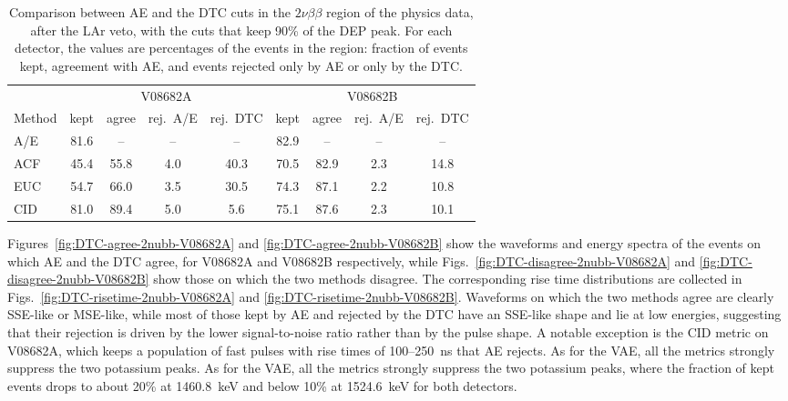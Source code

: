 \begin{table}[H]
    \centering
    \small
    \begin{tabular}{lcccccccc}
        \toprule
         & \multicolumn{4}{c}{V08682A} & \multicolumn{4}{c}{V08682B} \\
        \cmidrule(lr){2-5} \cmidrule(lr){6-9}
        Method & kept & agree & rej.\ A/E & rej.\ DTC & kept & agree & rej.\ A/E & rej.\ DTC \\
        \midrule
        A/E & 81.6 &  --  &  -- & --   & 82.9 &  --  &  -- & --   \\
        ACF & 45.4 & 55.8 & 4.0 & 40.3 & 70.5 & 82.9 & 2.3 & 14.8 \\
        EUC & 54.7 & 66.0 & 3.5 & 30.5 & 74.3 & 87.1 & 2.2 & 10.8 \\
        CID & 81.0 & 89.4 & 5.0 & 5.6  & 75.1 & 87.6 & 2.3 & 10.1 \\
        \bottomrule
    \end{tabular}
    \caption{Comparison between \ac{AE} and the \ac{DTC} cuts in the $2\nu\beta\beta$ region of the physics data, after the LAr veto, with the cuts that keep 90\% of the \ac{DEP} peak. For each detector, the values are percentages of the events in the region: fraction of events kept, agreement with \ac{AE}, and events rejected only by \ac{AE} or only by the \ac{DTC}.}
    \label{tab:DTC-cuts-2nubb}
\end{table}

Figures~\ref{fig:DTC-agree-2nubb-V08682A} and \ref{fig:DTC-agree-2nubb-V08682B} show the waveforms and energy spectra of the events on which \ac{AE} and the \ac{DTC} agree, for V08682A and V08682B respectively, while Figs.~\ref{fig:DTC-disagree-2nubb-V08682A} and \ref{fig:DTC-disagree-2nubb-V08682B} show those on which the two methods disagree. The corresponding rise time distributions are collected in Figs.~\ref{fig:DTC-risetime-2nubb-V08682A} and \ref{fig:DTC-risetime-2nubb-V08682B}. Waveforms on which the two methods agree are clearly \ac{SSE}-like or \ac{MSE}-like, while most of those kept by \ac{AE} and rejected by the \ac{DTC} have an \ac{SSE}-like shape and lie at low energies, suggesting that their rejection is driven by the lower signal-to-noise ratio rather than by the pulse shape. A notable exception is the \ac{CID} metric on V08682A, which keeps a population of fast pulses with rise times of 100--250~ns that \ac{AE} rejects. As for the \ac{VAE}, all the metrics strongly suppress the two potassium peaks. As for the \ac{VAE}, all the metrics strongly suppress the two potassium peaks, where the fraction of kept events drops to about 20\% at 1460.8~keV and below 10\% at 1524.6~keV for both detectors. 


